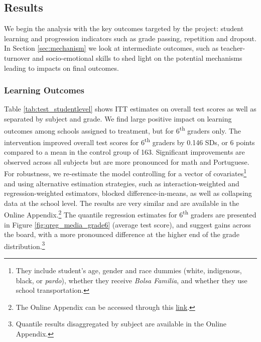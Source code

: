 \documentclass[11pt,a4paper]{article}
\begin{document}
\subsection{Results} \label{sec:results}
We begin the analysis with the key outcomes targeted by the project: student learning and progression indicators such as grade passing, repetition and dropout. In Section \ref{sec:mechanism} we look at intermediate outcomes, such as teacher-turnover and socio-emotional skills to shed light on the potential mechanisms leading to impacts on final outcomes.

\subsubsection*{Learning Outcomes} \label{sec:skills}

Table \ref{tab:test_studentlevel} shows ITT estimates on overall test scores as well as separated by subject and grade. We find large positive impact on learning outcomes among schools assigned to treatment, but for 6\textsuperscript{th} graders only. The intervention improved overall test scores for 6\textsuperscript{th} graders by 0.146 SDs, or 6 points compared to a mean in the control group of 163. Significant improvements are observed across all subjects but are more pronounced for math and Portuguese. For robustness, we re-estimate the model controlling for a vector of covariates\footnote{They include student's age, gender and race dummies (white, indigenous, black, or \textit{pardo}), whether they receive \textit{Bolsa Familia}, and whether they use school transportation.} and using alternative estimation strategies, such as interaction-weighted and regression-weighted estimators, blocked difference-in-means, as well as collapsing data at the school level. The results are very similar and are available in the Online Appendix.\footnote{The Online Appendix can be accessed through this \href{https://github.com/worldbank/brazil-pip-education/blob/master/pip_app.pdf}{link}.} The quantile regression estimates for 6\textsuperscript{th} graders are presented in Figure \ref{fig:qreg_media_grade6} (average test score), and suggest gains across the board, with a more pronounced difference at the higher end of the grade distribution.\footnote{Quantile results disaggregated by subject are available in the Online Appendix.}
\end{document}
